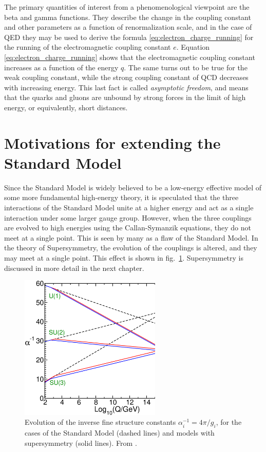 \documentclass[twoside,english]{uiofysmaster}
\begin{document}
The primary quantities of interest from a phenomenological viewpoint are the beta and gamma functions. They describe the change in the coupling constant and other parameters as a function of renormalization scale, and in the case of QED they may be used to derive the formula \eqref{eq:electron_charge_running} for the running of the electromagnetic coupling constant $e$. Equation \eqref{eq:electron_charge_running} shows that the electromagnetic coupling constant increases as a function of the energy $q$. The same turns out to be true for the weak coupling constant, while the strong coupling constant of QCD decreases with increasing energy. This last fact is called {\it asymptotic freedom}, and means that the quarks and gluons are unbound by strong forces in the limit of high energy, or equivalently, short distances. 





\section[Motivations for extending the Standard Model]{Motivations for extending the\\ Standard Model}
\label{sec:motivations_for_extending_the_SM}
Since the Standard Model is widely believed to be a low-energy effective model of some more fundamental high-energy theory, it is speculated that the three interactions of the Standard Model unite at a higher energy and act as a single interaction under some larger gauge group. However, when the three couplings are evolved to high energies using the Callan-Symanzik equations, they do not meet at a single point. This is seen by many as a flaw of the Standard Model. In the theory of Supersymmetry, the evolution of the couplings is altered, and they may meet at a single point. This effect is shown in fig.\ \ref{fig:coupling_unification}. Supersymmetry is discussed in more detail in the next chapter.
\begin{figure}[hbt]
	\centering
	\includegraphics[width=0.6\textwidth]{figures/susyintro/unification.eps}
	\caption{Evolution of the inverse fine structure constants $\alpha^{-1}_i = 4\pi/g_i$, for the cases of the Standard Model (dashed lines) and models with supersymmetry (solid lines). From \cite{Martin:1997ns}.}
	\label{fig:coupling_unification}
\end{figure}
\end{document}
